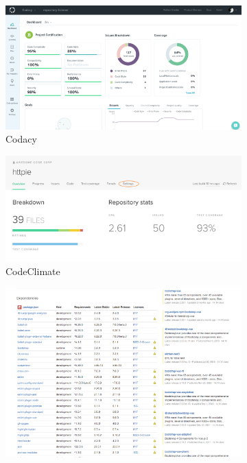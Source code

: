 \documentclass{prrcs}
\begin{document}
\begin{figure}[h]
    \centering
    \begin{subfigure}[b]{0.1\textwidth}
        \centering
        \includegraphics[width=\textwidth]{codacy_dashboard.png}
        \caption*{{\footnotesize Codacy}}
    \end{subfigure}
    \hfill
    \begin{subfigure}[b]{0.1\textwidth}  
        \centering 
        \includegraphics[width=\textwidth]{codeclimate_dashboard.png}
        \caption*{{\footnotesize CodeClimate}}
    \end{subfigure}
    \hfill
    \begin{subfigure}[b]{0.1\textwidth}   
        \centering 
        \includegraphics[width=\textwidth]{librariesio_dashboard.png}

\end{subfigure}
\end{figure}
\end{document}
